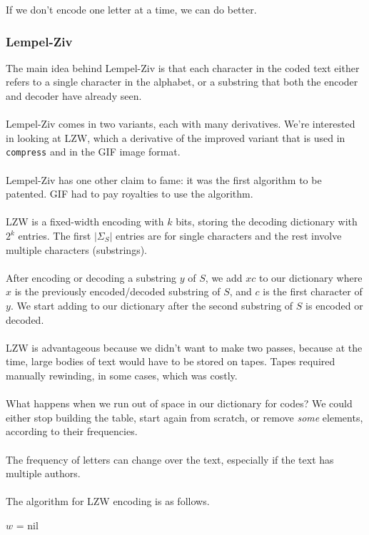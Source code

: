 \documentclass[]{article}
\theoremstyle{definition}
\begin{document}
				If we don't encode one letter at a time, we can do better.
			
			\subsubsection{Lempel-Ziv}
				The main idea behind Lempel-Ziv is that each character in the coded text either refers to a single character in the alphabet, or a substring that both the encoder and decoder have already seen.
				\\ \\
				Lempel-Ziv comes in two variants, each with many derivatives. We're interested in looking at LZW, which a derivative of the improved variant that is used in \verb+compress+ and in the GIF image format.
				\\ \\
				Lempel-Ziv has one other claim to fame: it was the first algorithm to be patented. GIF had to pay royalties to use the algorithm.
				\\ \\
				LZW is a fixed-width encoding with $k$ bits, storing the decoding dictionary with $2^k$ entries. The first $|\Sigma_S|$ entries are for single characters and the rest involve multiple characters (substrings).
				\\ \\
				After encoding or decoding a substring $y$ of $S$, we add $xc$ to our dictionary where $x$ is the previously encoded/decoded substring of $S$, and $c$ is the first character of $y$. We start adding to our dictionary after the second substring of $S$ is encoded or decoded.
				\\ \\
				LZW is advantageous because we didn't want to make two passes, because at the time, large bodies of text would have to be stored on tapes. Tapes required manually rewinding, in some cases, which was costly.
				\\ \\
				What happens when we run out of space in our dictionary for codes? We could either stop building the table, start again from scratch, or remove \emph{some} elements, according to their frequencies.
				\\ \\
				The frequency of letters can change over the text, especially if the text has multiple authors.
				\\ \\
				The algorithm for LZW encoding is as follows. \\
				\begin{algorithm}[H]
					$w$ = nil\;
				\end{algorithm}
				
\end{document}
